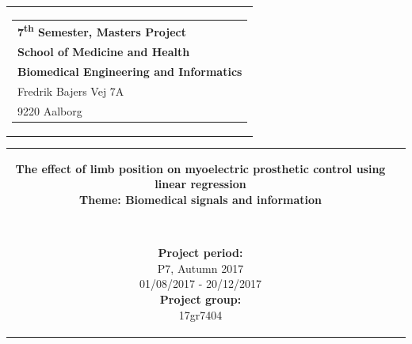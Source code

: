 % 
\thispagestyle{empty}
\begin{titlepage}
	{\samepage 
		
		\begin{tabular}{r}
			\parbox{\textwidth}{  
				\hfill \hspace{2cm} \parbox{8cm}{\begin{tabular}{l} %
						{\small \textbf{\textcolor{aaublue}{{7\textsuperscript{th} Semester, Masters Project}}}}\\
						{\small \textbf{\textcolor{aaublue}{School of Medicine and Health}}}\\
						{\small \textbf{\textcolor{aaublue}{Biomedical Engineering and Informatics}}}\\
						{\small \textcolor{aaublue}{Fredrik Bajers Vej 7A}} \\
						{\small \textcolor{aaublue}{9220 Aalborg}} \\
			\end{tabular}}}
	\end{tabular}}
	
	\begin{tabular}{cc}
		\parbox{7cm}{
			
			\textbf{The effect of limb position on myoelectric prosthetic control using linear regression}
			\\
			\textbf{Theme: Biomedical signals and information}
			
			\small{
				\\
			}
			
			
			\parbox{8cm}{
				
				
				\textbf{Project period:}\\
				P7, Autumn 2017\\
				01/08/2017 - 20/12/2017\\
				
				\textbf{Project group:}\\
				17gr7404\\ %
				
}}
\end{tabular}
\end{titlepage}

